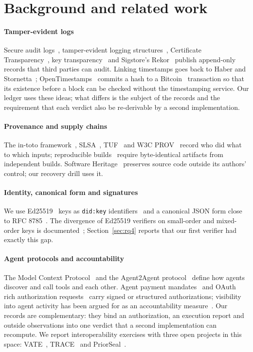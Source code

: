 \documentclass[preprint,12pt,authoryear]{elsarticle}
\newcommand{\code}[1]{\texttt{#1}}
\begin{document}
\section{Background and related work}\label{sec:related}

\paragraph{Tamper-evident logs} Secure audit logs~\citep{schneier1999}, tamper-evident logging structures~\citep{crosby2009}, Certificate Transparency~\citep{rfc6962}, key transparency~\citep{coniks} and Sigstore's Rekor~\citep{sigstore} publish append-only records that third parties can audit. Linking timestamps goes back to Haber and Stornetta~\citep{haber1991}; OpenTimestamps~\citep{ots} commits a hash to a Bitcoin~\citep{nakamoto2008} transaction so that its existence before a block can be checked without the timestamping service. Our ledger uses these ideas; what differs is the subject of the records and the requirement that each verdict also be re-derivable by a second implementation.

\paragraph{Provenance and supply chains} The in-toto framework~\citep{intoto}, SLSA~\citep{slsa}, TUF~\citep{tuf} and W3C PROV~\citep{prov} record who did what to which inputs; reproducible builds~\citep{lamb2022} require byte-identical artifacts from independent builds. Software Heritage~\citep{swh} preserves source code outside its authors' control; our recovery drill uses it.

\paragraph{Identity, canonical form and signatures} We use Ed25519~\citep{bernstein2012,rfc8032} keys as \code{did:key} identifiers~\citep{didcore,didkey} and a canonical JSON form close to RFC 8785~\citep{rfc8785}. The divergence of Ed25519 verifiers on small-order and mixed-order keys is documented~\citep{chalkias2020,brendel2021}; Section~\ref{sec:rq4} reports that our first verifier had exactly this gap.

\paragraph{Agent protocols and accountability} The Model Context Protocol~\citep{mcp} and the Agent2Agent protocol~\citep{a2a} define how agents discover and call tools and each other. Agent payment mandates~\citep{ap2} and OAuth rich authorization requests~\citep{rfc9396} carry signed or structured authorizations; visibility into agent activity has been argued for as an accountability measure~\citep{chan2024}. Our records are complementary: they bind an authorization, an execution report and outside observations into one verdict that a second implementation can recompute. We report interoperability exercises with three open projects in this space: VATE~\citep{vate}, TRACE~\citep{trace} and PriorSeal~\citep{priorseal}.
\end{document}
